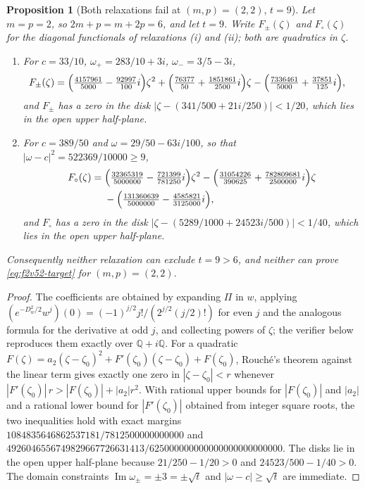 \documentclass[11pt]{article}
\newtheorem{proposition}[theorem]{Proposition}
\theoremstyle{definition}
\theoremstyle{remark}
\begin{document}
\begin{proposition}[Both relaxations fail at \((m,p)=(2,2)\), \(t=9\)]
\label{prop:f2v52-nogo}
Let \(m=p=2\), so \(2m+p=m+2p=6\), and let \(t=9\).  Write
\(F_\pm(\zeta)\) and \(F_\circ(\zeta)\) for the diagonal functionals of
relaxations \textup{(i)} and \textup{(ii)}; both are quadratics in
\(\zeta\).
\begin{enumerate}[label=\textup{(\alph*)}]
\item For \(c=33/10\), \(\omega_+=283/10+3i\), \(\omega_-=3/5-3i\),
\begin{equation}
\begin{aligned}
 F_\pm(\zeta)={}&\Bigl(\tfrac{4157961}{5000}-\tfrac{92997}{100}i\Bigr)\zeta^2
 +\Bigl(\tfrac{76377}{50}+\tfrac{1851861}{2500}i\Bigr)\zeta
 -\Bigl(\tfrac{7336461}{5000}+\tfrac{37851}{125}i\Bigr),
\end{aligned}
\label{eq:f2v52-fpm}
\end{equation}
and \(F_\pm\) has a zero in the disk \(|\zeta-(341/500+21i/250)|<1/20\),
which lies in the open upper half-plane.
\item For \(c=389/50\) and \(\omega=29/50-63i/100\), so that
\(|\omega-c|^2=522369/10000\ge9\),
\begin{equation}
\begin{aligned}
 F_\circ(\zeta)={}&\Bigl(\tfrac{32365319}{5000000}-\tfrac{721399}{781250}i\Bigr)\zeta^2
 -\Bigl(\tfrac{31054226}{390625}+\tfrac{782809681}{2500000}i\Bigr)\zeta\\
 &-\Bigl(\tfrac{131360639}{5000000}-\tfrac{4585821}{3125000}i\Bigr),
\end{aligned}
\label{eq:f2v52-fcirc}
\end{equation}
and \(F_\circ\) has a zero in the disk
\(|\zeta-(5289/1000+24523i/500)|<1/40\), which lies in the open upper
half-plane.
\end{enumerate}
Consequently neither relaxation can exclude \(t=9>6\), and neither can
prove \eqref{eq:f2v52-target} for \((m,p)=(2,2)\).
\end{proposition}

\begin{proof}
The coefficients are obtained by expanding
\(\Pi\) in \(w\), applying
\((e^{-D_w^2/2}w^j)(0)=(-1)^{j/2}j!/(2^{j/2}(j/2)!)\) for even \(j\)
and the analogous formula for the derivative at odd \(j\), and
collecting powers of \(\zeta\); the verifier below reproduces them
exactly over \(\mathbb Q+i\mathbb Q\).  For a quadratic
\(F(\zeta)=a_2(\zeta-\zeta_0)^2+F'(\zeta_0)(\zeta-\zeta_0)+F(\zeta_0)\),
Rouch\'{e}'s theorem against the linear term gives exactly one zero in
\(|\zeta-\zeta_0|<r\) whenever
\(|F'(\zeta_0)|\,r>|F(\zeta_0)|+|a_2|r^2\).  With rational upper
bounds for \(|F(\zeta_0)|\) and \(|a_2|\) and a rational lower bound
for \(|F'(\zeta_0)|\) obtained from integer square roots, the two
inequalities hold with exact margins
\(1084835646862537181/7812500000000000\) and
\(4926046556749829667726631413/625000000000000000000000000\).  The
disks lie in the open upper half-plane because
\(21/250-1/20>0\) and \(24523/500-1/40>0\).  The domain constraints
\(\operatorname{Im}\omega_\pm=\pm3=\pm\sqrt t\) and
\(|\omega-c|\ge\sqrt t\) are immediate.
\end{proof}
\end{document}

